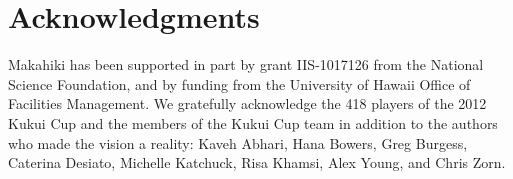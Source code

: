 \documentclass{acm_proc_article-sp}
\begin{document}
\section{Acknowledgments}

Makahiki has been supported in part by grant IIS-1017126 from the National
Science Foundation, and by funding from the University of Hawaii Office of Facilities
Management.   We gratefully acknowledge the 418 players of the 2012 Kukui
Cup and the members of the Kukui Cup team in addition to the authors who made the vision a
reality:  Kaveh Abhari, Hana Bowers, Greg Burgess, Caterina Desiato,
Michelle Kat\-chuck, Risa Khamsi, Alex Young, and Chris Zorn. 


  

\balancecolumns
\end{document}
